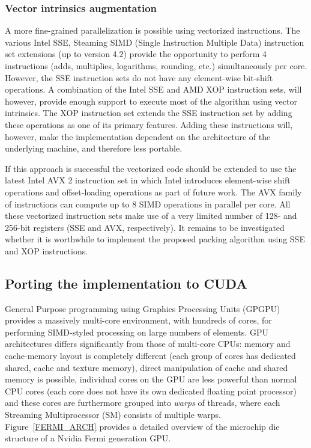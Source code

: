  \subsubsection{Vector intrinsics augmentation}
 A more fine-grained parallelization is possible using vectorized instructions. The various Intel SSE, Steaming SIMD (Single Instruction Multiple Data) instruction set extensions (up to version 4.2) provide
 the opportunity to perform 4 instructions (adds, multiplies, logarithms, rounding, etc.) simultaneously per core. However, the SSE instruction sets do not have any element-wise bit-shift operations. A combination 
 of the Intel SSE and AMD XOP instruction sets, will however, provide enough support to execute most of the algorithm using vector intrinsics. The XOP instruction set extends the SSE instruction set by adding these 
 operations as one of its primary features. Adding these instructions will, however, make the implementation dependent on the architecture of the underlying machine, and therefore less portable. 
 
 If this approach is successful the vectorized code should be extended to use the latest Intel AVX 2 instruction set in which Intel introduces element-wise shift operations and offset-loading operations as part of 
 future work. The AVX family of instructions can compute up to 8 SIMD operations in parallel per core. All these vectorized instruction sets make use of a very limited number of 128- and 256-bit registers (SSE and 
 AVX, respectively). It remains to be investigated whether it is worthwhile to implement the proposed packing algorithm using SSE and XOP instructions.
\subsection{Porting the implementation to CUDA}
General Purpose programming using Graphics Processing Units (GPGPU) provides a massively multi-core environment, with hundreds of cores, for performing SIMD-styled 
processing on large numbers of elements. GPU architectures differs significantly from those of multi-core CPUs: memory and cache-memory layout is completely different (each group of cores 
has dedicated shared, cache and texture memory), direct manipulation of cache and shared memory is possible, individual cores on the GPU are less powerful than normal CPU cores (each core does not have its own dedicated floating point 
processor) and these cores are furthermore grouped into \textit{warps} of threads, where each Streaming Multiprocessor (SM) consists of multiple warps. Figure~\ref{FERMI_ARCH} provides a detailed overview of the microchip die structure of a Nvidia Fermi generation GPU.

